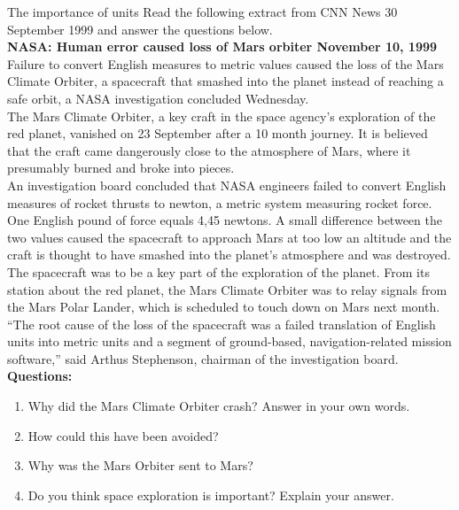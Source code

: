\begin{casestudy}{The importance of units }
            \nopagebreak
Read the following extract from CNN News 30 September 1999 and answer the questions below.\\
\textbf{NASA: Human error caused loss of Mars orbiter November 10, 1999}\\
Failure to convert English measures to metric values caused the loss of the Mars Climate Orbiter, a spacecraft that smashed into the planet instead of reaching a safe orbit, a NASA investigation concluded Wednesday.\\
The Mars Climate Orbiter, a key craft in the space agency's exploration of the red planet, vanished on 23 September after a 10 month journey. It is believed that the craft came dangerously close to the atmosphere of Mars, where it presumably burned and broke into pieces.\\
An investigation board concluded that NASA engineers failed to convert English measures of rocket thrusts to newton, a metric system measuring rocket force. One English pound of force equals 4,45 newtons. A small difference between the two values caused the spacecraft to approach Mars at too low an altitude and the craft is thought to have smashed into the planet's atmosphere and was destroyed.\\
The spacecraft was to be a key part of the exploration of the planet. From its station about the red planet, the Mars Climate Orbiter was to relay signals from the Mars Polar Lander, which is scheduled to touch down on Mars next month.\\
``The root cause of the loss of the spacecraft was a failed translation of English units into metric units and a segment of ground-based, navigation-related mission software,'' said Arthus Stephenson, chairman of the investigation board.\\
\textbf{Questions:}\\
\begin{enumerate}[noitemsep, label=\textbf{\arabic*}. ] 
\item Why did the Mars Climate Orbiter crash? Answer in your own words.
\item How could this have been avoided?
\item Why was the Mars Orbiter sent to Mars?
\item Do you think space exploration is important? Explain your answer.
\end{enumerate}
\end{casestudy}
